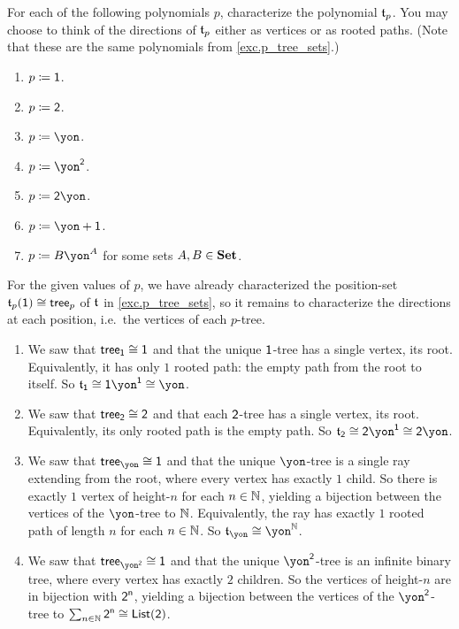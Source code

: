 \documentclass[Book-Poly]{subfiles}
\begin{document}
\begin{exercise}\label{exc.p_tree_polys}
For each of the following polynomials $p$, characterize the polynomial $\mathfrak{t}_p$.
You may choose to think of the directions of $\mathfrak{t}_p$ either as vertices or as rooted paths.
(Note that these are the same polynomials from \cref{exc.p_tree_sets}.)
\begin{enumerate}
	\item \label{exc.p_tree_polys.1} $p\coloneqq\textsf{1}$.
	\item $p\coloneqq\textsf{2}$.
	\item \label{exc.p_tree_polys.unary} $p\coloneqq\yon$.
	\item \label{exc.p_tree_polys.binary} $p\coloneqq\yon^\2$.
	\item $p\coloneqq{\2\yon}$.
	\item $p\coloneqq{\yon+\1}$.
	\item \label{exc.p_tree_polys.monomial} $p\coloneqq{B\yon^A}$ for some sets $A,B\in\mathbf{Set}$.
\qedhere
\end{enumerate}
\begin{solution}
For the given values of $p$, we have already characterized the position-set $\mathfrak{t}_p(\textsf{1})\cong\mathsf{tree}_p$ of $\mathfrak{t}$ in \cref{exc.p_tree_sets}, so it remains to characterize the directions at each position, i.e.\ the vertices of each $p$-tree.
\begin{enumerate}
    \item We saw that $\mathsf{tree}_{\textsf{1}}\cong\textsf{1}$ and that the unique $\textsf{1}$-tree has a single vertex, its root.
    Equivalently, it has only $1$ rooted path: the empty path from the root to itself.
    So $\ema{t}_\1\iso\1\yon^\1\iso\yon$.
    \item We saw that $\mathsf{tree}_{\textsf{2}}\cong\textsf{2}$ and that each $\textsf{2}$-tree has a single vertex, its root.
    Equivalently, its only rooted path is the empty path.
    So $\ema{t}_\2\iso\2\yon^\1\iso\2\yon$.
    \item We saw that $\tr_\yon\iso\1$ and that the unique $\yon$-tree is a single ray extending from the root, where every vertex has exactly $1$ child.
    So there is exactly $1$ vertex of height-$n$ for each $n\in\mathbb{N}$, yielding a bijection between the vertices of the $\yon$-tree to $\mathbb{N}$.
    Equivalently, the ray has exactly $1$ rooted path of length $n$ for each $n\in\mathbb{N}$.
    So $\ema{t}_\yon\iso\yon^\nn$.
    \item We saw that $\tr_{\yon^\2}\iso\1$ and that the unique $\yon^\2$-tree is an infinite binary tree, where every vertex has exactly $2$ children.
    So the vertices of height-$n$ are in bijection with $\textsf{2}^{\mathsf{n}}$, yielding a bijection between the vertices of the $\yon^\2$-tree to $\sum_{n\in\mathbb{N}}\textsf{2}^{\mathsf{n}}\cong\mathsf{List}(\textsf{2})$.

\end{enumerate}
\end{solution}
\end{exercise}
\end{document}
